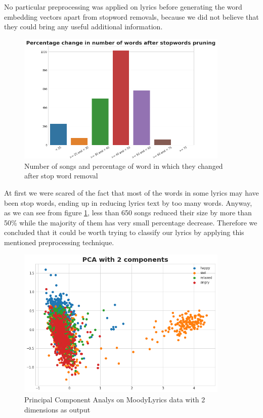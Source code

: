 No particular preprocessing was applied on lyrics before generating the word embedding
vectors apart from stopword removals, because we did not believe that they could bring
any useful additional information.

\begin{figure}
  \centering
  \includegraphics[width=0.9\textwidth]{./chapters/chapter4/images/percentage-change.png}
  \caption{Number of songs and percentage of word in which they changed after stop word removal}
  \label{fig:ml-percentage-change}
\end{figure}

At first we were scared of the fact that most of the words in some lyrics may have been
stop words, ending up in reducing lyrics text by too many words. Anyway, as we can see 
from figure \ref{fig:ml-percentage-change}, less than 650 songs reduced their size by 
more than 50\% while the majority of them has very small percentage decrease. Therefore
we concluded that it could be worth trying to classify our lyrics by applying this mentioned
preprocessing technique.

\begin{figure}
  \centering
  \includegraphics[width=0.9\textwidth]{./chapters/chapter4/images/ml-pca.png}
  \caption{Principal Component Analys on MoodyLyrics data with 2 dimensions as output}
  \label{fig:ml-pca}
\end{figure}

